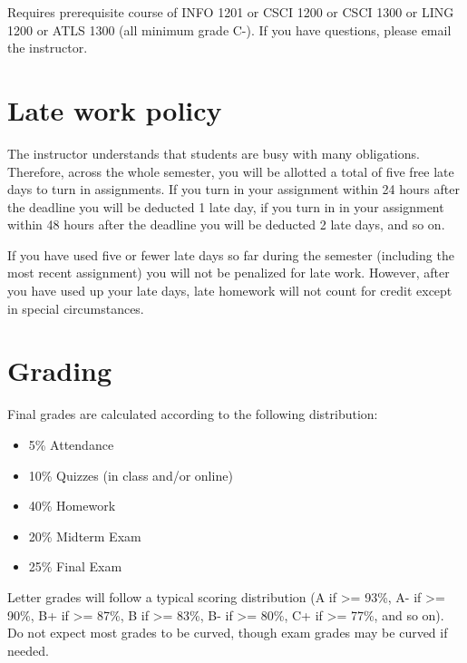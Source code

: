 \documentclass[10pt]{memoir}
\begin{document}
Requires prerequisite course of INFO 1201 or CSCI 1200 or CSCI 1300 or LING 1200 or ATLS 1300 (all minimum grade C-). If you have questions, please email the instructor.

\section{Late work policy}
The instructor understands that students are busy with many obligations. Therefore, across the whole semester, you will be allotted a total of five free late days to turn in assignments. If you turn in your assignment within 24 hours after the deadline you will be deducted 1 late day, if you turn in in your assignment within 48 hours after the deadline you will be deducted 2 late days, and so on. 

If you have used five or fewer late days so far during the semester (including the most recent assignment) you will not be penalized for late work. However, after you have used up your late days, late homework will not count for credit except in special circumstances.

\section{Grading}

Final grades are calculated according to the following distribution:
\begin{itemize}
\item 5\% Attendance
\item 10\% Quizzes (in class and/or online)
\item 40\% Homework
\item 20\% Midterm Exam
\item 25\% Final Exam
\end{itemize}

Letter grades will follow a typical scoring distribution (A if >= 93\%, A- if >= 90\%, B+ if >=
87\%, B if >= 83\%, B- if >= 80\%, C+ if >= 77\%, and so on). Do not expect most grades to be
curved, though exam grades may be curved if needed.

\end{document}
